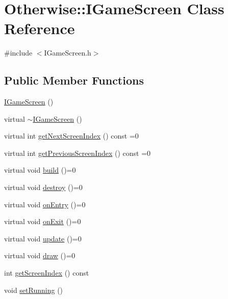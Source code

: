 \hypertarget{class_otherwise_1_1_i_game_screen}{}\section{Otherwise\+:\+:I\+Game\+Screen Class Reference}
\label{class_otherwise_1_1_i_game_screen}


{\ttfamily \#include $<$I\+Game\+Screen.\+h$>$}

\subsection*{Public Member Functions}
\begin{DoxyCompactItemize}
\item 
\hyperlink{class_otherwise_1_1_i_game_screen_a856ccdcb7cd54e77aed29bf949f3d55c}{I\+Game\+Screen} ()
\item 
virtual \hyperlink{class_otherwise_1_1_i_game_screen_a5246a2f0b07fcf439e96f9010ede0d8d}{$\sim$\+I\+Game\+Screen} ()
\item 
virtual int \hyperlink{class_otherwise_1_1_i_game_screen_acdb08f99516ee5b68da6ffc516ff4d4e}{get\+Next\+Screen\+Index} () const =0
\item 
virtual int \hyperlink{class_otherwise_1_1_i_game_screen_a33a79c0a5605b4e6bc37cb2d6c4d4c24}{get\+Previous\+Screen\+Index} () const =0
\item 
virtual void \hyperlink{class_otherwise_1_1_i_game_screen_abe1db4b7123d8c243daf2fd445bdecdd}{build} ()=0
\item 
virtual void \hyperlink{class_otherwise_1_1_i_game_screen_a21897cd62e554ffb61d82e06f12cef81}{destroy} ()=0
\item 
virtual void \hyperlink{class_otherwise_1_1_i_game_screen_a46fab0c9e5a34bc7c00a822c26585b2e}{on\+Entry} ()=0
\item 
virtual void \hyperlink{class_otherwise_1_1_i_game_screen_ab558b2a4f3ee7efce3af2d128ebc9a45}{on\+Exit} ()=0
\item 
virtual void \hyperlink{class_otherwise_1_1_i_game_screen_a21a101d8ebfefc248be6490c28b1aefb}{update} ()=0
\item 
virtual void \hyperlink{class_otherwise_1_1_i_game_screen_af6b64f08f3f08aa6505478da04f7e71c}{draw} ()=0
\item 
int \hyperlink{class_otherwise_1_1_i_game_screen_abceb471d87d9a24c62480f536b3f0922}{get\+Screen\+Index} () const
\item 
void \hyperlink{class_otherwise_1_1_i_game_screen_ae918af2057c649361ead54b3f0139ac3}{set\+Running} ()

\end{DoxyCompactItemize}
